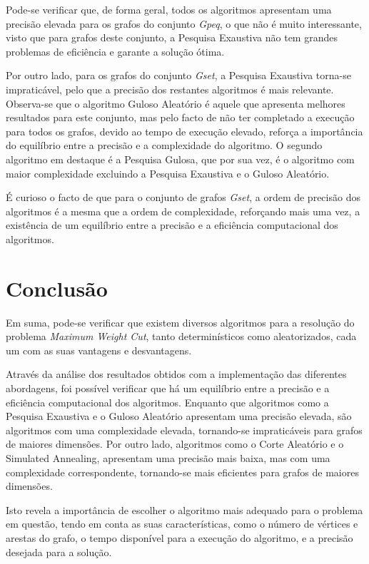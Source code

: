 \documentclass[mirror, portugues]{revdetua}
\begin{document}
Pode-se verificar que, de forma geral, todos os algoritmos apresentam uma precisão elevada para os grafos do conjunto \textit{Gpeq}, o que não é muito interessante, visto que para grafos deste conjunto, a Pesquisa Exaustiva não tem grandes problemas de eficiência e garante a solução ótima.

Por outro lado, para os grafos do conjunto \textit{Gset}, a Pesquisa Exaustiva torna-se impraticável, pelo que a precisão dos restantes algoritmos é mais relevante. Observa-se que o algoritmo Guloso Aleatório é aquele que apresenta melhores resultados para este conjunto, mas pelo facto de não ter completado a execução para todos os grafos, devido ao tempo de execução elevado, reforça a importância do equilíbrio entre a precisão e a complexidade do algoritmo. O segundo algoritmo em destaque é a Pesquisa Gulosa, que por sua vez, é o algoritmo com maior complexidade excluindo a Pesquisa Exaustiva e o Guloso Aleatório.

É curioso o facto de que para o conjunto de grafos \textit{Gset}, a ordem de precisão dos algoritmos é a mesma que a ordem de complexidade, reforçando mais uma vez, a existência de um equilíbrio entre a precisão e a eficiência computacional dos algoritmos.

\section{Conclusão}

Em suma, pode-se verificar que existem diversos algoritmos para a resolução do problema \textit{Maximum Weight Cut}, tanto determinísticos como aleatorizados, cada um com as suas vantagens e desvantagens.

Através da análise dos resultados obtidos com a implementação das diferentes abordagens, foi possível verificar que há um equilíbrio entre a precisão e a eficiência computacional dos algoritmos. Enquanto que algoritmos como a Pesquisa Exaustiva e o Guloso Aleatório apresentam uma precisão elevada, são algoritmos com uma complexidade elevada, tornando-se impraticáveis para grafos de maiores dimensões. Por outro lado, algoritmos como o Corte Aleatório e o Simulated Annealing, apresentam uma precisão mais baixa, mas com uma complexidade correspondente, tornando-se mais eficientes para grafos de maiores dimensões.

Isto revela a importância de escolher o algoritmo mais adequado para o problema em questão, tendo em conta as suas características, como o número de vértices e arestas do grafo, o tempo disponível para a execução do algoritmo, e a precisão desejada para a solução.




\end{document}
